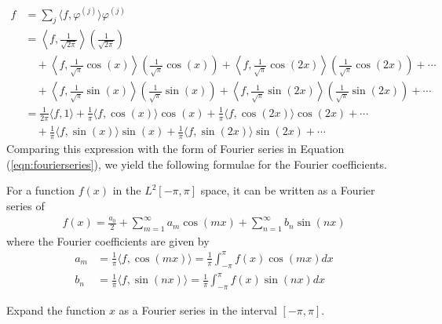 \begin{align*}
f &= \sum_{j} \langle f, \varphi^{(j)} \rangle \varphi^{(j)} \\ 
&= \left\langle f, \frac{1}{\sqrt{2\pi}} \right\rangle \left(\frac{1}{\sqrt{2\pi}}\right)\\
&\quad + \left\langle f, \frac{1}{\sqrt{\pi}}\cos(x) \right\rangle \left(\frac{1}{\sqrt{\pi}}\cos(x)\right) + \left\langle f, \frac{1}{\sqrt{\pi}}\cos(2x) \right\rangle \left(\frac{1}{\sqrt{\pi}}\cos(2x)\right) + \cdots \\
&\quad + \left\langle f, \frac{1}{\sqrt{\pi}}\sin(x) \right\rangle \left(\frac{1}{\sqrt{\pi}}\sin(x)\right) + \left\langle f, \frac{1}{\sqrt{\pi}}\sin(2x) \right\rangle \left(\frac{1}{\sqrt{\pi}}\sin(2x)\right) + \cdots \\
&= \frac{1}{2\pi} \langle f, 1 \rangle + \frac{1}{\pi} \langle f, \cos(x) \rangle \cos(x) + \frac{1}{\pi} \langle f, \cos(2x) \rangle \cos(2x) + \cdots \\
&\quad + \frac{1}{\pi}\langle f, \sin(x) \rangle \sin(x) + \frac{1}{\pi}\langle f, \sin(2x) \rangle \sin(2x) + \cdots
\end{align*}
Comparing this expression with the form of Fourier series in Equation (\ref{eqn:fourierseries}), we yield the following formulae for the Fourier coefficients.
\begin{proper}
\label{proper:fourierseries}
For a function $f(x)$ in the $L^2[-\pi, \pi]$ space, it can be written as a Fourier series of
\begin{align}
f(x) = \frac{a_0}{2} + \sum_{m=1}^{\infty} a_m \cos(mx) + \sum_{n=1}^{\infty} b_n \sin(nx) \label{eqn:fourierseri}
\end{align}
where the Fourier coefficients are given by
\begin{subequations}
\begin{align}
a_m &= \frac{1}{\pi}\langle f, \cos(mx) \rangle = \frac{1}{\pi} \int_{-\pi}^{\pi} f(x)\cos(mx) dx \label{eqn:fouriera} \\
b_n &= \frac{1}{\pi}\langle f, \sin(nx) \rangle = \frac{1}{\pi} \int_{-\pi}^{\pi} f(x)\sin(nx) dx \label{eqn:fourierb}
\end{align}    
\end{subequations}
\end{proper}
\begin{exmp}
\label{exmp:fourierx}
Expand the function $x$ as a Fourier series in the interval $[-\pi, \pi]$.
\end{exmp}
